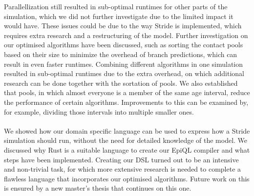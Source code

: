 Parallellization still resulted in sub-optimal runtimes for other parts of the simulation, which we did not further investigate due to the limited impact it would have. These issues could be due to the way Stride is implemented, which requires extra research and a restructuring of the model. Further investigation on our optimised algorithms have been discussed, such as sorting the contact pools based on their size to minimize the overhead of branch predictions, which can result in even faster runtimes. Combining different algorithms in one simulation resulted in sub-optimal runtimes due to the extra overhead, on which additional research can be done together with the sortation of pools. We also established that pools, in which almost everyone is a member of the same age interval, reduce the performance of certain algorithms. Improvements to this can be examined by, for example, dividing those intervals into multiple smaller ones. 
\\\\
We showed how our domain specific language can be used to express how a Stride simulation should run, without the need for detailed knowledge of the model. We discussed why Rust is a suitable language to create our EpiQL compiler and what steps have been implemented. Creating our DSL turned out to be an intensive and non-trivial task, for which more extensive research is needed to complete a flawless language that incorporates our optimised algorithms. Future work on this is ensured by a new master's thesis that continues on this one.